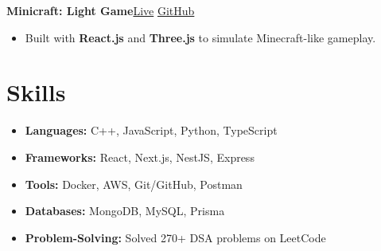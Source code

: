 \documentclass[a4paper,10pt]{article}
\newcommand{\entry}[2]{\textbf{#1}\hfill #2}
\begin{document}
\entry{Minicraft: Light Game}
{\href{https://minicarft.netlify.app/}{Live} \textbullet{} 
\href{https://github.com/amanrathore48/Minicraft}{GitHub}}
\begin{itemize}[leftmargin=0.5cm]
    \item Built with \textbf{React.js} and \textbf{Three.js} to simulate Minecraft-like gameplay.
\end{itemize}
\vspace{2pt}

\section*{Skills}
\begin{multicols}{2}
\begin{itemize}[leftmargin=0.5cm]
    \item \textbf{Languages:} C++, JavaScript, Python, TypeScript
    \item \textbf{Frameworks:} React, Next.js, NestJS, Express
    \item \textbf{Tools:} Docker, AWS, Git/GitHub, Postman
    \item \textbf{Databases:} MongoDB, MySQL, Prisma
    \item \textbf{Problem-Solving:} Solved 270+ DSA problems on LeetCode
\end{itemize}
\end{multicols}
\end{document}
